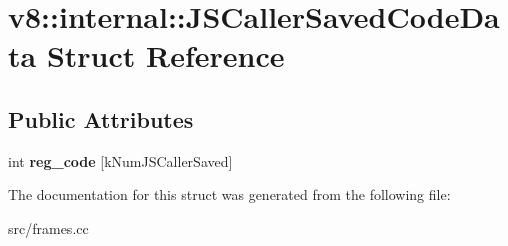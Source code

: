 \hypertarget{structv8_1_1internal_1_1_j_s_caller_saved_code_data}{}\section{v8\+:\+:internal\+:\+:J\+S\+Caller\+Saved\+Code\+Data Struct Reference}
\label{structv8_1_1internal_1_1_j_s_caller_saved_code_data}
\subsection*{Public Attributes}
\begin{DoxyCompactItemize}
\item 
\hypertarget{structv8_1_1internal_1_1_j_s_caller_saved_code_data_aac079f7a23ad6fb19c3c81ec262850fb}{}int {\bfseries reg\+\_\+code} \mbox{[}k\+Num\+J\+S\+Caller\+Saved\mbox{]}\label{structv8_1_1internal_1_1_j_s_caller_saved_code_data_aac079f7a23ad6fb19c3c81ec262850fb}

\end{DoxyCompactItemize}


The documentation for this struct was generated from the following file\+:\begin{DoxyCompactItemize}
\item 
src/frames.\+cc\end{DoxyCompactItemize}
